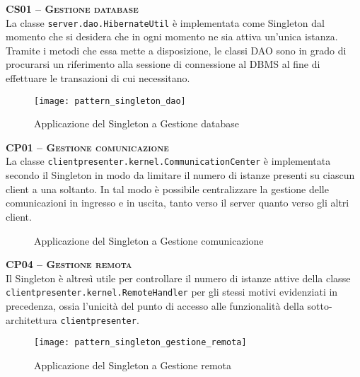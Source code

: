 \begin{description}
  \item{\scshape\bfseries CS01 -- Gestione database}\\
La classe \texttt{server.dao.HibernateUtil} è implementata come Singleton dal momento che si desidera che in ogni momento ne sia attiva un'unica istanza. Tramite i metodi che essa mette a disposizione, le classi DAO sono in grado di procurarsi un riferimento alla sessione di connessione al DBMS al fine di effettuare le transazioni di cui necessitano.

\begin{figure}[H]
  \centering
  \texttt{[image: pattern\_singleton\_dao]}
  \caption{Applicazione del  Singleton a \textsf{Gestione database}}\label{fig:singleton2}
\end{figure}

  \item{\scshape\bfseries CP01 -- Gestione comunicazione}\\
La classe \texttt{clientpresenter.kernel.CommunicationCenter} è implementata secondo il  Singleton in modo da limitare il numero di istanze presenti su ciascun client a una soltanto. In tal modo è possibile centralizzare la gestione delle comunicazioni in ingresso e in uscita, tanto verso il server quanto verso gli altri client.

\begin{figure}[H]
  \centering
  \caption{Applicazione del  Singleton a \textsf{Gestione comunicazione}}\label{fig:singleton1}
\end{figure}

  \item{\scshape\bfseries CP04 -- Gestione remota}\\
Il  Singleton è altresì utile per controllare il numero di istanze attive della classe \texttt{clientpresenter.kernel.RemoteHandler} per gli stessi motivi evidenziati in precedenza, ossia l'unicità del punto di accesso alle funzionalità della sotto-architettura \texttt{clientpresenter}.

\begin{figure}[H]
  \centering
  \texttt{[image: pattern\_singleton\_gestione\_remota]}
  \caption{Applicazione del  Singleton a \textsf{Gestione remota}}\label{fig:singleton3}
\end{figure}

\end{description}
\clearpage

